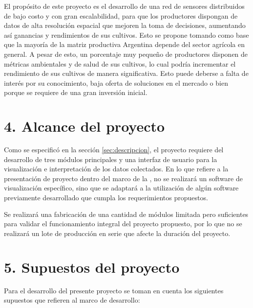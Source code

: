 \documentclass[
11pt, %
codirector, %
]{charter}
\begin{document}
El propósito de este proyecto es el desarrollo de una red de sensores distribuidos de bajo costo y con gran escalabilidad, para que los productores dispongan de datos de alta resolución espacial que mejoren la toma de decisiones, aumentando así ganancias y rendimientos de sus cultivos. Esto se propone tomando como base que la mayoría de la matriz productiva Argentina depende del sector agrícola en general. A pesar de esto, un porcentaje muy pequeño de productores disponen de métricas ambientales y de salud de sus cultivos, lo cual podría incrementar el rendimiento de sus cultivos de manera significativa. Esto puede deberse a falta de interés por su conocimiento, baja oferta de soluciones en el mercado o bien porque se requiere de una gran inversión inicial.

\section{4. Alcance del proyecto}
\label{sec:alcance}

Como se especificó en la sección \ref{sec:descripcion}, el proyecto requiere del desarrollo de tres módulos principales y una interfaz de usuario para la visualización e interpretación de los datos colectados. En lo que refiere a la presentación de proyecto dentro del marco de la \degreename, no se realizará un software de visualización específico, sino que se adaptará a la utilización de algún software previamente desarrollado que cumpla los requerimientos propuestos.

Se realizará una fabricación de una cantidad de módulos limitada pero suficientes para validar el funcionamiento integral del proyecto propuesto, por lo que no se realizará un lote de producción en serie que afecte la duración del proyecto.

\section{5. Supuestos del proyecto}
\label{sec:supuestos}

Para el desarrollo del presente proyecto se toman en cuenta los siguientes supuestos que refieren al marco de desarrollo:
\end{document}
